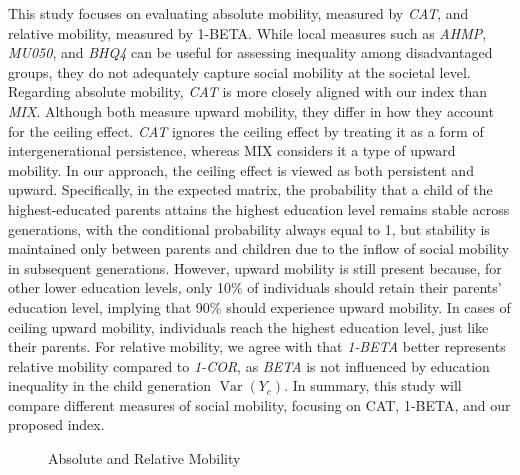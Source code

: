 This study focuses on evaluating absolute mobility, measured by \textit{CAT}, and relative mobility, measured by 1-BETA. While local measures such as \textit{AHMP}, \textit{MU050}, and \textit{BHQ4} can be useful for assessing inequality among disadvantaged groups, they do not adequately capture social mobility at the societal level. Regarding absolute mobility, \textit{CAT} is more closely aligned with our index than \textit{MIX}. Although both measure upward mobility, they differ in how they account for the ceiling effect. \textit{CAT} ignores the ceiling effect by treating it as a form of intergenerational persistence, whereas MIX considers it a type of upward mobility. In our approach, the ceiling effect is viewed as both persistent and upward. Specifically, in the expected matrix, the probability that a child of the highest-educated parents attains the highest education level remains stable across generations, with the conditional probability always equal to 1, but stability is maintained only between parents and children due to the inflow of social mobility in subsequent generations. However, upward mobility is still present because, for other lower education levels, only 10\% of individuals should retain their parents' education level, implying that 90\% should experience upward mobility. In cases of ceiling upward mobility, individuals reach the highest education level, just like their parents. For relative mobility, we agree with \citet{van2024intergenerational} that \textit{1-BETA} better represents relative mobility compared to \textit{1-COR}, as \textit{BETA} is not influenced by education inequality in the child generation $\operatorname{Var}(Y_c)$. In summary, this study will compare different measures of social mobility, focusing on CAT, 1-BETA, and our proposed index.

\begin{figure}[H]
    \centering
    \caption{Absolute and Relative Mobility}
    \label{fig:abs_rel}
\end{figure}

